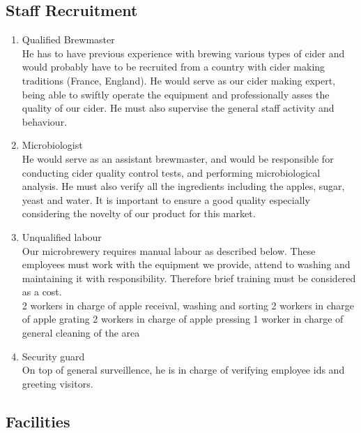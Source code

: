\documentclass[11pt]{article}
\begin{document}
  \subsection{Staff Recruitment}
  \begin{enumerate}
  \item Qualified Brewmaster \\
He has to have previous experience with brewing various types of cider and would probably have to be recruited from a country with cider making traditions (France, England). He would serve as our cider making expert, being able to swiftly operate the equipment and professionally asses the quality of our cider. He must also supervise the general staff activity and behaviour.

  \item Microbiologist \\
He would serve as an assistant brewmaster, and would be responsible for conducting cider quality control tests, and performing microbiological analysis. He must also verify all the ingredients including the apples, sugar, yeast and water.
It is important to ensure a good quality especially considering the novelty of our product for this market.

  \item Unqualified labour \\
Our microbrewery requires manual labour as described below. These employees must work with the equipment we provide, attend to washing and maintaining it with responsibility. Therefore brief training must be considered as a cost. \\
  2 workers in charge of apple receival, washing and sorting
  2 workers in charge of apple grating
  2 workers in charge of apple pressing
  1 worker in charge of general cleaning of the area

  \item Security guard \\
On top of general surveillence, he is in charge of verifying employee ids and greeting visitors.
  \end{enumerate}


  \subsection{Facilities}
\end{document}
